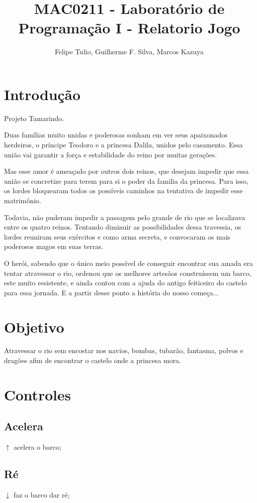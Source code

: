 \documentclass[a4paper,12pt]{article}
\title{MAC0211 - Laboratório de Programação I - Relatorio Jogo}
\author{Felipe Tulio, Guilherme F. Silva, Marcos Kazuya}
\begin{document}
\maketitle
\section {Introdução}

			
Projeto Tamarindo.
 
Duas famílias muito unidas e poderosas sonham em ver seus apaixonados herdeiros, o príncipe
Teodoro e a princesa Dalila, unidos pelo casamento. Essa união vai garantir a força
e estabilidade do reino por muitas gerações.

Mas esse amor é ameaçado por outros dois reinos, que desejam impedir que essa união se concretize para terem para si o poder da familia da princesa. Para isso, os lordes bloquearam todos os possíveis caminhos na tentativa de impedir esse matrimônio.

Todavia, não puderam impedir a passagem pelo grande de rio que se localizava entre os quatro reinos. Tentando diminuir as possibilidades dessa travessia, os lordes reuniram seus exércitos e como arma secreta, e convocaram os mais poderosos magos em suas terras.


O herói, sabendo que o único meio possível de conseguir encontrar sua amada era tentar atravessar o rio, ordenou que os melhores artesãos construíssem um barco, este muito resistente, e ainda contou com a ajuda do antigo feiticeiro do castelo para essa jornada. E a partir desse ponto a história do nosso começa...

\section {Objetivo}

Atravessar o rio sem encostar nos navios, bombas, tubarão, fantasma, polvos e dragões afim de encontrar o castelo onde a princesa mora.


\section {Controles}
\subsection{Acelera}
$\uparrow$ acelera o barco; 

\subsection{Ré}
$\downarrow$ faz o barco dar ré;
\end{document}
